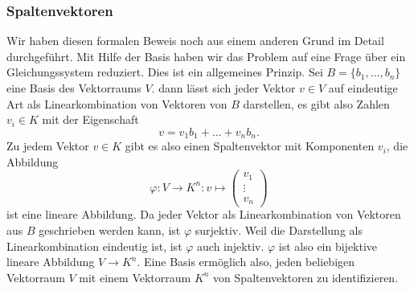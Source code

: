 \subsubsection{Spaltenvektoren}
Wir haben diesen formalen Beweis noch aus einem anderen Grund im
Detail durchgeführt.
Mit Hilfe der Basis haben wir das Problem auf eine Frage über ein
Gleichungssystem reduziert.
Dies ist ein allgemeines Prinzip.
Sei $B=\{b_1,\dots,b_n\}$ eine Basis des Vektorraums $V$.
dann lässt sich jeder Vektor $v\in V$  auf eindeutige Art als
Linearkombination von Vektoren von $B$ darstellen, es gibt
also Zahlen $v_i\in K$ mit der Eigenschaft
\[
v=v_1b_1+\dots+v_nb_n.
\]
Zu jedem Vektor $v\in K$ gibt es also einen Spaltenvektor mit Komponenten
$v_i$, die Abbildung
\[
\varphi\colon
V\to K^n
:
v\mapsto \begin{pmatrix}v_1\\\vdots\\v_n\end{pmatrix}
\]
ist eine lineare Abbildung.
Da jeder Vektor als Linearkombination von Vektoren aus $B$ geschrieben
werden kann, ist $\varphi$ surjektiv.
Weil die Darstellung als Linearkombination eindeutig ist, ist $\varphi$
auch injektiv.
$\varphi$ ist also ein bijektive lineare Abbildung $V\to K^n$.
Eine Basis ermöglich also, jeden beliebigen Vektorraum $V$ mit einem
Vektorraum $K^n$ von Spaltenvektoren zu identifizieren.

